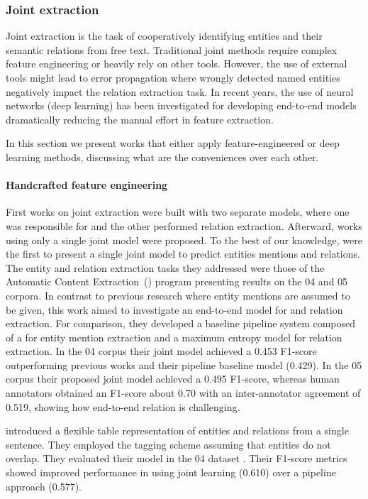 \subsubsection{Joint extraction}

Joint extraction is the task of cooperatively identifying entities and their semantic relations from free text.
Traditional joint methods require complex feature engineering or heavily rely on other  tools. However, the use of external tools might lead to error propagation where wrongly detected named entities negatively impact the relation extraction task.
In recent years, the use of neural networks (deep learning) has been investigated for developing end-to-end models dramatically reducing the manual effort in feature extraction.

In this section we present works that either apply feature-engineered or deep learning methods, discussing what are the conveniences over each other.


\paragraph{Handcrafted feature engineering}

First works on joint extraction were built with two separate models, where one was responsible for  and the other performed relation extraction.
Afterward, works using only a single joint model were proposed.
To the best of our knowledge, \textcite{li2014b} were the first to present a single joint model to predict entities mentions and relations.
The entity and relation extraction tasks they addressed were those of the Automatic Content Extraction~() program \parencite{doddington2004a} presenting results on the 04 and 05 corpora.
In contrast to previous research where entity mentions are assumed to be given, this work aimed to investigate an end-to-end model for  and relation extraction.
For comparison, they developed a baseline pipeline system composed of a  for entity mention extraction and a maximum entropy model for relation extraction.
In the 04 corpus their joint model achieved a 0.453 F1-score outperforming previous works and their pipeline baseline model (0.429).
In the 05 corpus their proposed joint model achieved a 0.495 F1-score, whereas human annotators obtained an F1-score about 0.70 with an inter-annotator agreement of 0.519, showing how end-to-end relation is challenging.

\textcite{miwa2014a} introduced a flexible table representation of entities and relations from a single sentence.
They employed the  tagging scheme assuming that entities do not overlap.
They evaluated their model in the 04 dataset \parencite{roth2004a}.
Their F1-score metrics showed improved performance in using joint learning (0.610) over a pipeline approach (0.577).

